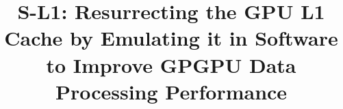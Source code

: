 \documentclass[pageno]{jpaper}
\begin{document}
\title{S-L1: Resurrecting the GPU L1 Cache by Emulating it in Software\\ to Improve GPGPU Data Processing Performance}

\date{}
\maketitle

\thispagestyle{empty}





% 






\end{document}
